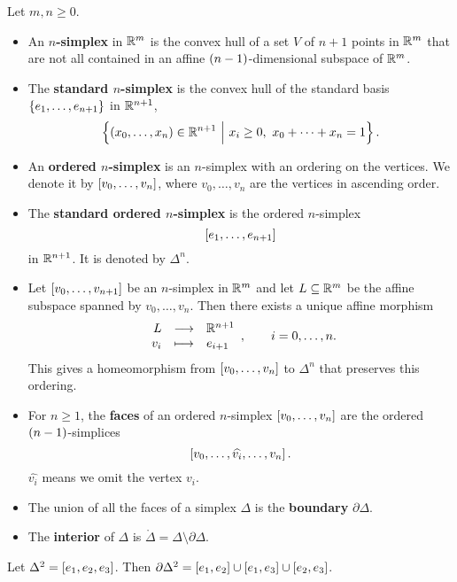 \begin{definition*}
Let $ m, n \ge 0 $.
\begin{itemize}
\item An \textbf{$ n $-simplex} in $ \mathbb{R}^m $ is the convex hull of a set $ V $ of $ n + 1 $ points in $ \mathbb{R}^m $ that are not all contained in an affine $ \br{n - 1} $-dimensional subspace of $ \mathbb{R}^m $.
\item The \textbf{standard $ n $-simplex} is the convex hull of the standard basis $ \cbr{e_1, \dots, e_{n + 1}} $ in $ \mathbb{R}^{n + 1} $,
$$ \cbr{\br{x_0, \dots, x_n} \in \RR^{n + 1} \st x_i \ge 0, \ x_0 + \dots + x_n = 1}. $$
\item An \textbf{ordered $ n $-simplex} is an $ n $-simplex with an ordering on the vertices. We denote it by $ \sbr{v_0, \dots, v_n} $, where $ v_0, \dots, v_n $ are the vertices in ascending order.
\item The \textbf{standard ordered $ n $-simplex} is the ordered $ n $-simplex
$$ \sbr{e_1, \dots, e_{n + 1}} $$
in $ \mathbb{R}^{n + 1} $. It is denoted by $ \Delta^n $.
\item Let $ \sbr{v_0, \dots, v_{n + 1}} $ be an $ n $-simplex in $ \mathbb{R}^m $ and let $ L \subseteq \mathbb{R}^m $ be the affine subspace spanned by $ v_0, \dots, v_n $. Then there exists a unique affine morphism
$$ \function{L}{\RR^{n + 1}}{v_i}{e_{i + 1}}, \qquad i = 0, \dots, n. $$
This gives a homeomorphism from $ \sbr{v_0, \dots, v_n} $ to $ \Delta^n $ that preserves this ordering.
\item For $ n \ge 1 $, the \textbf{faces} of an ordered $ n $-simplex $ \sbr{v_0, \dots, v_n} $ are the ordered $ \br{n - 1} $-simplices
$$ \sbr{v_0, \dots, \widehat{v_i}, \dots, v_n}. $$
$ \widehat{v_i} $ means we omit the vertex $ v_i $.
\item The union of all the faces of a simplex $ \Delta $ is the \textbf{boundary} $ \partial\Delta $.
\item The \textbf{interior} of $ \Delta $ is $ \mathring{\Delta} = \Delta \setminus \partial\Delta $.
\end{itemize}
\end{definition*}

\begin{example*}
Let $ \Delta^2 = \sbr{e_1, e_2, e_3} $. Then $ \partial\Delta^2 = \sbr{e_1, e_2} \cup \sbr{e_1, e_3} \cup \sbr{e_2, e_3} $.
\end{example*}

\pagebreak

